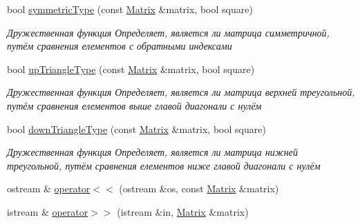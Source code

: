 \begin{DoxyCompactItemize}
bool \hyperlink{class_matrix_a6952b686de4d766d5e6071ea05ce1e5e}{symmetric\-Type} (const \hyperlink{class_matrix}{Matrix} \&matrix, bool square)
\begin{DoxyCompactList}\small\item\em Дружественная функция Определяет, является ли матрица симметричной, путём сравнения елементов с обратными индексами \end{DoxyCompactList}\item 
bool \hyperlink{class_matrix_add887b389e9c6a532fd0de569ded15e1}{up\-Triangle\-Type} (const \hyperlink{class_matrix}{Matrix} \&matrix, bool square)
\begin{DoxyCompactList}\small\item\em Дружественная функция Определяет, является ли матрица верхней треугольной, путём сравнения елементов выше главой диагонали с нулём \end{DoxyCompactList}\item 
bool \hyperlink{class_matrix_a9bca4cd9ce5dbee1a08831254b359093}{down\-Triangle\-Type} (const \hyperlink{class_matrix}{Matrix} \&matrix, bool square)
\begin{DoxyCompactList}\small\item\em Дружественная функция Определяет, является ли матрица нижней треугольной, путём сравнения елементов ниже главой диагонали с нулём \end{DoxyCompactList}\item 
ostream \& \hyperlink{class_matrix_a85a2865bcc2b7c641162bbd4aa13a7c6}{operator$<$$<$} (ostream \&os, const \hyperlink{class_matrix}{Matrix} \&matrix)
\item 
istream \& \hyperlink{class_matrix_a65e4cbf2651c384b15830e97747feebc}{operator$>$$>$} (istream \&in, \hyperlink{class_matrix}{Matrix} \&matrix)
\end{DoxyCompactItemize}


